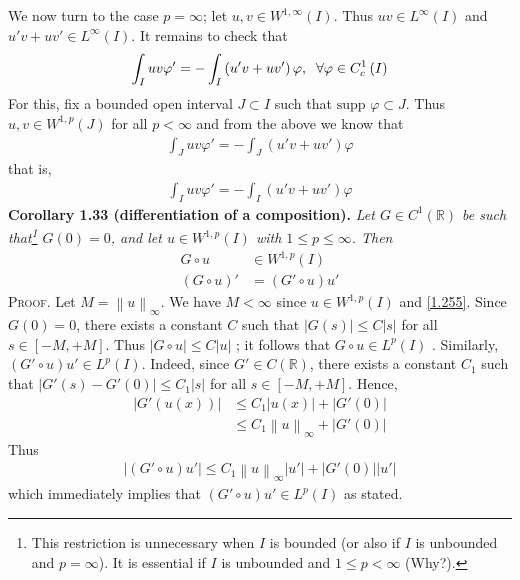 \documentclass[a4paper,oneside]{article}
\numberwithin{equation}{section}
\begin{document}
We now turn to the case $p=\infty$; let $u,v\in W^{1,\infty}\left(I\right)$. Thus $uv\in L^{\infty}\left(I\right)$ and $u'v+uv'\in L^{\infty}\left(I\right)$. It remains to check that
\begin{align}
\int_I {uv\varphi '}  =  - \int_I {\left( {u'v + uv'} \right)\varphi } ,\hspace{0.2cm}\forall \varphi  \in C_c^1\left( I \right)
\end{align}
For this, fix a bounded open interval $J\subset I$ such that $\mbox{supp } \varphi \subset J$. Thus $u,v\in W^{1,p}\left(J\right)$ for all $p<\infty$ and from the above we know that
\begin{align}
\int_J {uv\varphi '}  =  - \int_J {\left( {u'v + uv'} \right)\varphi } 
\end{align}
that is,
\begin{align}
\int_I {uv\varphi '}  =  - \int_I {\left( {u'v + uv'} \right)\varphi } 
\end{align}
\textbf{Corollary 1.33 (differentiation of a composition).} \textit{Let $G \in C^1\left(\mathbb{R}\right)$ be such that\footnote{This restriction is unnecessary when $I$ is bounded (or also if $I$ is unbounded and $p=\infty$). It is essential if $I$ is unbounded and $1\le p<\infty$ (Why?).} $G\left(0\right)=0$, and let $u\in W^{1,p}\left(I\right)$ with $1\le p \le \infty$. Then}
\begin{align}
G \circ u &\in {W^{1,p}}\left( I \right)\\
\left( {G \circ u} \right)' &= \left( {G' \circ u} \right)u'
\end{align}
\textsc{Proof.} Let $M = {\left\| u \right\|_\infty }$. We have $M<\infty$ since $u\in W^{1,p}\left(I\right)$ and \eqref{1.255}. Since $G\left(0\right)=0$, there exists a constant $C$ such that $\left| {G\left( s \right)} \right| \le C\left| s \right|$ for all $s\in \left[-M,+M\right]$. Thus $\left| {G \circ u} \right| \le C\left| u \right|$ ; it follows that $G \circ u \in {L^p}\left( I \right)$ . Similarly, $\left( {G' \circ u} \right)u' \in {L^p}\left( I \right)$. Indeed, since $G' \in C\left(\mathbb{R}\right)$, there exists a constant $C_1$ such that $\left| {G'\left( s \right) - G'\left( 0 \right)} \right| \le {C_1}\left| s \right|$ for all $s\in \left[-M,+M\right]$. Hence,
\begin{align}
\left| {G'\left( {u\left( x \right)} \right)} \right| &\le {C_1}\left| {u\left( x \right)} \right| + \left| {G'\left( 0 \right)} \right|\\
 &\le {C_1}{\left\| u \right\|_\infty } + \left| {G'\left( 0 \right)} \right|
\end{align}
Thus
\begin{align}
\left| {\left( {G' \circ u} \right)u'} \right| \le {C_1}{\left\| u \right\|_\infty }\left| {u'} \right| + \left| {G'\left( 0 \right)} \right|\left| {u'} \right|
\end{align}
which immediately implies that $\left( {G' \circ u} \right)u' \in {L^p}\left( I \right)$ as stated. 
\end{document}
